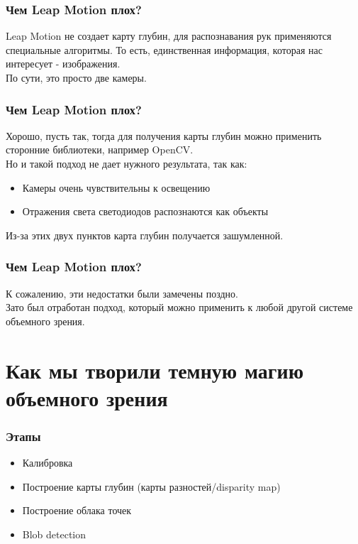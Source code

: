 \documentclass{beamer}
\begin{document}
		\begin{frame}
			\frametitle{Чем Leap Motion плох?}
			
			Leap Motion не создает карту глубин, для распознавания рук применяются специальные
			алгоритмы. То есть, единственная информация, которая нас интересует - изображения.\\
			По сути, это просто две камеры.
		\end{frame}
		
		\begin{frame}
			\frametitle{Чем Leap Motion плох?}
				
			Хорошо, пусть так, тогда для получения карты глубин можно применить сторонние библиотеки,
			например OpenCV.\\
			Но и такой подход не дает нужного результата, так как:\\
			
			\begin{itemize}
				\item Камеры очень чувствительны к освещению
				\item Отражения света светодиодов распознаются как объекты
			\end{itemize}
			
			Из-за этих двух пунктов карта глубин получается зашумленной.
		\end{frame}
		
		\begin{frame}
			\frametitle{Чем Leap Motion плох?}
			
			К сожалению, эти недостатки были замечены поздно.\\
			Зато был отработан подход, который можно применить к любой другой
			системе объемного зрения.
		\end{frame}
		
	\section{Как мы творили темную магию объемного зрения}
		\begin{frame}
			\frametitle{Этапы}
			
			\begin{itemize}
				\item Калибровка
				\item Построение карты глубин (карты разностей/disparity map)
				\item Построение облака точек
				\item Blob detection
			\end{itemize}
		\end{frame}
		
\end{document}
